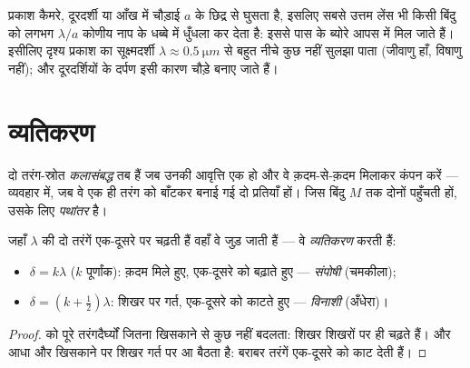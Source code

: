 \begin{remark}[विवर्तन हर यंत्र की सीमा है]\label{rem:g12:light-as-wave:limits}
प्रकाश कैमरे, दूरदर्शी या आँख में चौड़ाई $a$ के छिद्र से घुसता है, इसलिए
सबसे उत्तम लेंस भी किसी बिंदु को लगभग $\lambda/a$ कोणीय नाप के धब्बे में
धुँधला कर देता है: इससे पास के ब्योरे आपस में मिल जाते हैं। इसीलिए दृश्य
प्रकाश का सूक्ष्मदर्शी $\lambda \approx
\qty{0.5}{\micro m}$ से बहुत नीचे कुछ नहीं सुलझा पाता (जीवाणु हाँ,
विषाणु नहीं); और दूरदर्शियों के दर्पण इसी कारण चौड़े बनाए जाते हैं।
\end{remark}

\section{व्यतिकरण}

\begin{definition}[कलासंबद्ध स्रोत, पथांतर]\label{def:g12:light-as-wave:coherent}
दो तरंग-स्रोत \emph{कलासंबद्ध} तब हैं जब उनकी
आवृत्ति एक हो और वे क़दम-से-क़दम मिलाकर कंपन करें --- व्यवहार में, जब
वे एक ही तरंग को बाँटकर बनाई गई दो प्रतियाँ हों। जिस बिंदु $M$ तक
दोनों पहुँचती हों, उसके लिए \emph{पथांतर}%
है।
\end{definition}

\begin{proposition}[व्यतिकरण की शर्तें]\label{prop:g12:light-as-wave:conditions}
जहाँ  $\lambda$ की दो  तरंगें
एक-दूसरे पर चढ़ती हैं वहाँ वे जुड़ जाती हैं --- वे
\emph{व्यतिकरण} करती हैं:
\begin{itemize}
  \item $\delta = k\lambda$ ($k$ पूर्णांक): क़दम मिले हुए, एक-दूसरे को बढ़ाते हुए ---
        \emph{संपोषी}  (चमकीला);
  \item $\delta = (k + \tfrac12)\lambda$: शिखर पर गर्त, एक-दूसरे को काटते हुए ---
        \emph{विनाशी}  (अँधेरा)।
\end{itemize}
\end{proposition}

\begin{proof}
 को पूरे तरंगदैर्घ्यों जितना खिसकाने से कुछ नहीं
बदलता: शिखर शिखरों पर ही चढ़ते हैं। और आधा  और खिसकाने पर
शिखर गर्त पर आ बैठता है: बराबर तरंगें एक-दूसरे को काट देती हैं।
\end{proof}

